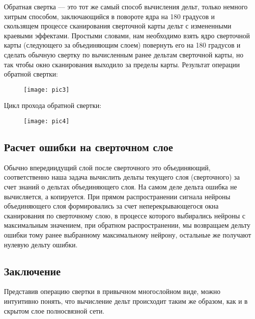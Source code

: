 \documentclass[11pt,colorlinks=true]{article}
\begin{document}
 Обратная свертка –-- это тот же самый способ вычисления дельт, только немного хитрым способом, заключающийся в повороте ядра на 180 градусов и скользящем процессе сканирования сверточной карты дельт с измененными краевыми эффектами. Простыми словами, нам необходимо взять ядро сверточной карты (следующего за объединяющим слоем) повернуть его на 180 градусов и сделать обычную свертку по вычисленным ранее дельтам сверточной карты, но так чтобы окно сканирования выходило за пределы карты. Результат операции обратной свертки:
   \begin{figure}[!h]
 	\begin{center}
 		\begin{minipage}[!h]{1\linewidth}
 			\texttt{[image: pic3]}
 		\end{minipage}
 	\end{center}
 \end{figure}

 Цикл прохода обратной свертки:
   \begin{figure}[!h]
	\begin{center}
		\begin{minipage}[!h]{1\linewidth}
			\texttt{[image: pic4]}
		\end{minipage}
	\end{center}
\end{figure}

\subsection{Расчет ошибки на сверточном слое}

Обычно впередиидущий слой после сверточного это объединяющий, соответственно наша задача вычислить дельты текущего слоя (сверточного) за счет знаний о дельтах объединяющего слоя. На самом деле дельта ошибка не вычисляется, а копируется. При прямом распространении сигнала нейроны объединяющего слоя формировались за счет неперекрывающегося окна сканирования по сверточному слою, в процессе которого выбирались нейроны с максимальным значением, при обратном распространении, мы возвращаем дельту ошибки тому ранее выбранному максимальному нейрону, остальные же получают нулевую дельту ошибки.

\subsection{Заключение}

Представив операцию свертки в привычном многослойном виде, можно интуитивно понять, что вычисление дельт происходит таким же образом, как и в скрытом слое полносвязной сети. 
\end{document}
